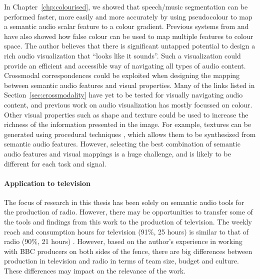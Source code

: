 In Chapter~\ref{chp:colourised}, we showed that speech/music segmentation can be performed faster, more easily and more
accurately by using pseudocolour to map a semantic audio scalar feature to a colour gradient. Previous systems from
\citet{Tzanetakis2000} and \citet{Mason2007} have also showed how false colour can be used to map multiple features to
colour space.  The author believes that there is significant untapped potential to design a rich audio visualization
that ``looks like it sounds''. Such a visualization could provide an efficient and accessible way of navigating all
types of audio content.  Crossmodal correspondences could be exploited when designing the mapping between semantic
audio features and visual properties.  Many of the links listed in Section~\ref{sec:crossmodality} have yet to be
tested for visually navigating audio content, and previous work on audio visualization has mostly focussed on colour.
Other visual properties such as shape and texture could be used to increase the richness of the information presented
in the image.  For example, textures can be generated using procedural techniques \citep{Ebert1994}, which allows them
to be synthesized from semantic audio features.  However, selecting the best combination of semantic audio features and
visual mappings is a huge challenge, and is likely to be different for each task and signal.



\paragraph{Application to television}

The focus of research in this thesis has been solely on semantic audio tools for the production of radio. However,
there may be opportunities to transfer some of the tools and findings from this work to the production of television.
The weekly reach and consumption hours for television (91\%, 25 hours) is similar to that of radio (90\%, 21 hours)
\citep[p.  82, 119]{Ofcom2017}.  However, based on the author's experience in working with BBC producers on both sides
of the fence, there are big differences between production in television and radio in terms of team size, budget and
culture. These differences may impact on the relevance of the work.

